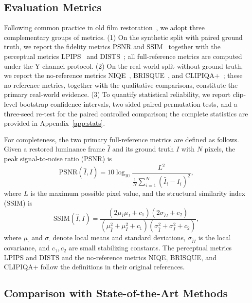 \subsection{Evaluation Metrics}\label{subsec:metrics}

Following common practice in old film restoration~\cite{rtn2022,rrtn2024,mao2025mambaofr}, we adopt three complementary groups of metrics. (1) On the synthetic split with paired ground truth, we report the fidelity metrics PSNR and SSIM~\cite{wang2004ssim} together with the perceptual metrics LPIPS~\cite{zhang2018lpips} and DISTS~\cite{ding2020dists}; all full-reference metrics are computed under the Y-channel protocol. (2) On the real-world split without ground truth, we report the no-reference metrics NIQE~\cite{mittal2013niqe}, BRISQUE~\cite{mittal2012brisque}, and CLIPIQA+~\cite{wang2023clipiqa}; these no-reference metrics, together with the qualitative comparisons, constitute the primary real-world evidence. (3) To quantify statistical reliability, we report clip-level bootstrap confidence intervals, two-sided paired permutation tests, and a three-seed re-test for the paired controlled comparison; the complete statistics are provided in Appendix~\ref{app:stats}.

For completeness, the two primary full-reference metrics are defined as follows. Given a restored luminance frame $\hat{I}$ and its ground truth $I$ with $N$ pixels, the peak signal-to-noise ratio (PSNR) is
\begin{equation}
\mathrm{PSNR}(\hat{I}, I) = 10\log_{10}\frac{L^{2}}{\frac{1}{N}\sum_{i=1}^{N}(\hat{I}_{i}-I_{i})^{2}},
\end{equation}
where $L$ is the maximum possible pixel value, and the structural similarity index (SSIM) is
\begin{equation}
\mathrm{SSIM}(\hat{I}, I) = \frac{(2\mu_{\hat{I}}\mu_{I}+c_{1})(2\sigma_{\hat{I}I}+c_{2})}{(\mu_{\hat{I}}^{2}+\mu_{I}^{2}+c_{1})(\sigma_{\hat{I}}^{2}+\sigma_{I}^{2}+c_{2})},
\end{equation}
where $\mu_{\cdot}$ and $\sigma_{\cdot}$ denote local means and standard deviations, $\sigma_{\hat{I}I}$ is the local covariance, and $c_{1},c_{2}$ are small stabilizing constants. The perceptual metrics LPIPS and DISTS and the no-reference metrics NIQE, BRISQUE, and CLIPIQA+ follow the definitions in their original references.

\subsection{Comparison with State-of-the-Art Methods}\label{subsec:sota}

